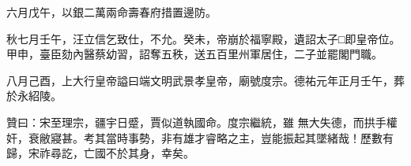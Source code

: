 \begin{pinyinscope}
 六月戊午，以銀二萬兩命壽春府措置邊防。



 秋七月壬午，汪立信乞致仕，不允。癸未，帝崩於福寧殿，遺詔太子□即皇帝位。甲申，臺臣劾內醫蔡幼習，詔奪五秩，送五百里州軍居住，二子並罷閣門職。



 八月己酉，上大行皇帝謚曰端文明武景孝皇帝，廟號度宗。德祐元年正月壬午，葬於永紹陵。



 贊曰：宋至理宗，疆宇日蹙，賈似道執國命。度宗繼統，雖
 無大失德，而拱手權奸，衰敝寢甚。考其當時事勢，非有雄才睿略之主，豈能振起其墜緒哉！歷數有歸，宋祚尋訖，亡國不於其身，幸矣。



\end{pinyinscope}